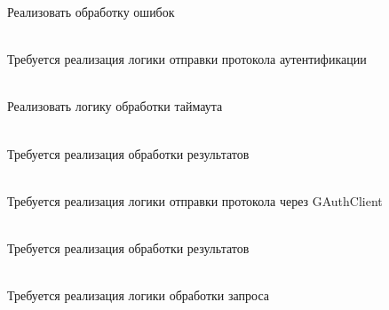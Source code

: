 \begin{DoxyRefList}
Реализовать обработку ошибок  
\item[Member \doxylink{class_g_n_e_t_1_1_matrix_passwd2_a33af4c45fa48d7bf6dc251ab5178f3e5}{GNET\+::Matrix\+Passwd2\+::Delivery} (Manager\+::\+Session\+::\+ID proxy\+\_\+sid, const Octets\+Stream \&os\+Arg)]\hfill \\
\label{todo__todo000027}%
%
Требуется реализация логики отправки протокола аутентификации  
\item[Member \doxylink{class_g_n_e_t_1_1_matrix_passwd2_abd67d4f58dcf3a3a917209810ead7a7c}{GNET\+::Matrix\+Passwd2\+::On\+Timeout} ()]\hfill \\
\label{todo__todo000029}%
%
Реализовать логику обработки таймаута  
\item[Member \doxylink{class_g_n_e_t_1_1_matrix_passwd2_a433faf7b2ff9ec3e3e7cf91a8fc7fb8d}{GNET\+::Matrix\+Passwd2\+::Post\+Process} (Manager\+::\+Session\+::\+ID proxy\+\_\+sid, const Octets\+Stream \&os\+Arg, const Octets\+Stream \&os\+Res)]\hfill \\
\label{todo__todo000028}%
%
Требуется реализация обработки результатов  
\item[Member \doxylink{class_g_n_e_t_1_1_matrix_token_afa6e24621cac8593c4e95ed22cc12338}{GNET\+::Matrix\+Token\+::Delivery} (Manager\+::\+Session\+::\+ID proxy\+\_\+sid, const Octets\+Stream \&os\+Arg)]\hfill \\
\label{todo__todo000030}%
%
Требуется реализация логики отправки протокола через GAuth\+Client  
\item[Member \doxylink{class_g_n_e_t_1_1_matrix_token_a784d6fa1f7f2a7fd6df54da5fb83c885}{GNET\+::Matrix\+Token\+::Post\+Process} (Manager\+::\+Session\+::\+ID proxy\+\_\+sid, const Octets\+Stream \&os\+Arg, const Octets\+Stream \&os\+Res)]\hfill \\
\label{todo__todo000031}%
%
Требуется реализация обработки результатов  
\item[Member \doxylink{class_g_n_e_t_1_1_s_s_o_get_ticket_req_a7d2f631129750466c71a3c53910adad9}{GNET\+::SSOGet\+Ticket\+Req\+::Process} (Manager \texorpdfstring{$\ast$}{*}manager, Manager\+::\+Session\+::\+ID sid)]\hfill \\
\label{todo__todo000033}%
%
Требуется реализация логики обработки запроса 
\item[Member \doxylink{class_g_n_e_t_1_1_status_announce_ae5a6d07d7f9047b0d0a53cce09ed94b9}{GNET\+::Status\+Announce\+::Process} (Manager \texorpdfstring{$\ast$}{*}manager, Manager\+::\+Session\+::\+ID sid)]\hfill \\

\end{DoxyRefList}
